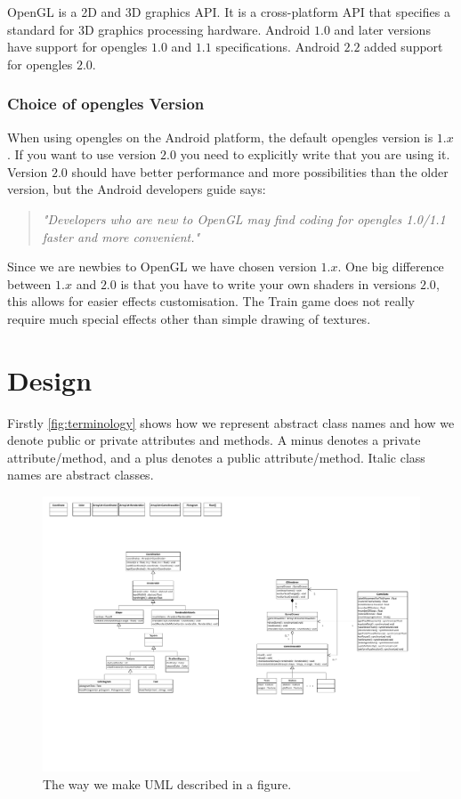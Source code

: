 OpenGL is a 2D and 3D graphics API. It is a cross-platform API that specifies a standard for 3D graphics processing hardware. Android $1.0$ and later versions have support for \ac{opengles} $1.0$ and $1.1$ specifications. Android $2.2$ added support for \ac{opengles} $2.0$. \citep{androidopengl, khronosopengles}

\subsubsection*{Choice of \ac{opengles} Version}
When using \ac{opengles} on the Android platform, the default \ac{opengles} version is $1.x$. If you want to use version $2.0$ you need to explicitly write that you are using it. Version $2.0$ should have better performance and more possibilities than the older version, but the Android developers guide says:
\begin{quote}
\textit{"Developers who are new to OpenGL may find coding for \ac{opengles} 1.0/1.1 faster and more convenient."} \citep{androidopengl}
\end{quote}
Since we are newbies to OpenGL we have chosen version $1.x$. One big difference between $1.x$ and $2.0$ is that you have to write your own shaders in versions $2.0$, this allows for easier effects customisation. The Train game does not really require much special effects other than simple drawing of textures.

\section{Design}
Firstly \autoref{fig:terminology} shows how we represent abstract class names and how we denote public or private attributes and methods. A minus denotes a private attribute/method, and a plus denotes a public attribute/method. Italic class names are abstract classes.
\begin{figure}[H]
\centering
\includegraphics[page=4,width=0.7\linewidth]{img/opengl.pdf}
\caption{The way we make UML described in a figure.}
\label{fig:terminology}
\end{figure}


